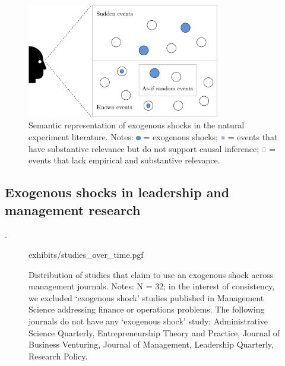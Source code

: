\begin{refsection}
\begin{figure}[!htbp]
  \centering
  \includegraphics[width=0.75\textwidth]{exhibits/exogenous_shocks_and_ne.pdf}
  \caption{Semantic representation of exogenous shocks in the natural 
  experiment literature. Notes:  
  \includegraphics[width=0.0175\textwidth]{exhibits/exogenous_shocks_and_ne_0.pdf}
  = exogenous shocks;
  \includegraphics[width=0.0175\textwidth]{exhibits/exogenous_shocks_and_ne_1.pdf}
  = events that have substantive relevance but do not support causal inference;
  \includegraphics[width=0.0175\textwidth]{exhibits/exogenous_shocks_and_ne_2.pdf}
  = events that lack empirical and substantive relevance.}
  \label{fig:exogeneous_shocks_and_ne}
\end{figure}

\subsection{Exogenous shocks in leadership and management research}
\label{subsec:exogenous_shocks_in_management}

.

\begin{figure}[!htbp]
    \centering
    {exhibits/studies_over_time.pgf}
    \caption{Distribution of studies that claim to use an exogenous shock across
    management journals.  Notes: N = 32; in the interest of consistency, we
    excluded `exogenous shock' studies published in Management Science addressing
    finance or operations problems. The following journals do not have any
    `exogenous shock' study: Administrative Science Quarterly, Entrepreneurship
    Theory and Practice, Journal of Business Venturing, Journal of Management,
    Leadership Quarterly, Research Policy.}
    \label{fig:studies_across_journals}
\end{figure}         




\end{refsection}
